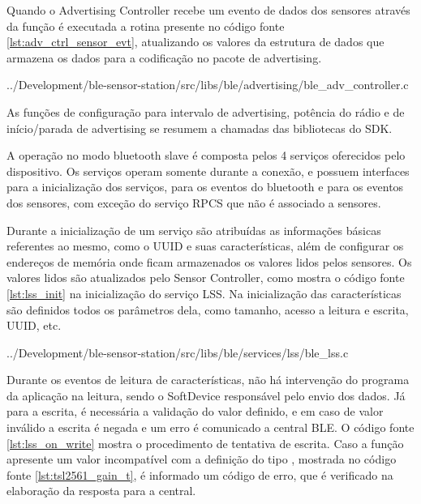 Quando o Advertising Controller recebe um evento de dados dos sensores através
da função  é executada a rotina presente no
código fonte \ref{lst:adv_ctrl_sensor_evt}, atualizando os valores da estrutura
de dados que armazena os dados para a codificação no pacote de advertising.

\begin{minipage}{0.95\linewidth} 

{../Development/ble-sensor-station/src/libs/ble/advertising/ble_adv_controller.c}
\end{minipage}

As funções de configuração para intervalo de advertising, potência do rádio e de
início/parada de advertising se resumem a chamadas das bibliotecas do SDK.


A operação no modo bluetooth slave é composta pelos 4 serviços oferecidos pelo
dispositivo. Os serviços operam somente durante a conexão, e possuem interfaces
para a inicialização dos serviços, para os eventos do bluetooth e para os
eventos dos sensores, com exceção do serviço RPCS que não é associado a
sensores.

Durante a inicialização de um serviço são atribuídas as informações básicas
referentes ao mesmo, como o UUID e suas características, além de configurar os
endereços de memória onde ficam armazenados os valores lidos pelos sensores. Os
valores lidos são atualizados pelo Sensor Controller, como mostra o código fonte
\ref{lst:lss_init} na inicialização do serviço LSS. Na inicialização das
características são definidos todos os parâmetros dela, como tamanho, acesso a
leitura e escrita, UUID, etc.

\begin{minipage}{0.95\linewidth} 
 
{../Development/ble-sensor-station/src/libs/ble/services/lss/ble_lss.c}
\end{minipage}

Durante os eventos de leitura de características, não há intervenção do programa
da aplicação na leitura, sendo o SoftDevice responsável pelo envio dos dados. Já
para a escrita, é necessária a validação do valor definido, e em caso de valor
inválido a escrita é negada e um erro é comunicado a central BLE. O código fonte
\ref{lst:lss_on_write} mostra o procedimento de tentativa de escrita. Caso a
função  apresente um valor incompatível
com a definição do tipo , mostrada no código fonte
\ref{lst:tsl2561_gain_t}, é informado um código de erro, que é verificado na
elaboração da resposta para a central.

